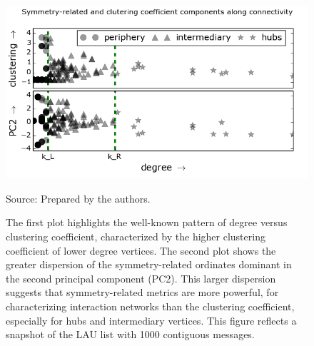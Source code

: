 																					\begin{figure} 
																					\centering
																					\caption{The first plot highlights the well-known pattern of degree versus clustering coefficient, characterized by the higher clustering coefficient of lower degree vertices.
																					    The second plot shows the greater dispersion of the symmetry-related ordinates dominant in the second principal component (PC2).
																					    This larger dispersion suggests that symmetry-related metrics are more powerful,
																					    for characterizing interaction networks than the clustering coefficient,
																					    especially for hubs and intermediary vertices.
																					    This figure reflects a snapshot of the LAU list with 1000 contiguous messages.}
																					    \includegraphics[width=.45\textwidth]{figs/im13PCAPLOT__}

																					    \label{fig:sym}
																					    \begin{flushleft}
																					    		Source: Prepared by the authors.\
																							\end{flushleft}
																							\end{figure}

